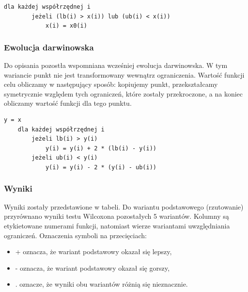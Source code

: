 \documentclass{mini}
\begin{document}
\begin{Verbatim}[baselinestretch=1.1]
	dla każdej współrzędnej i
		jeżeli (lb(i) > x(i)) lub (ub(i) < x(i))
			x(i) = x0(i)
\end{Verbatim}

\subsubsection*{Ewolucja darwinowska}
Do opisania pozostła wspomniana wcześniej ewolucja darwinowska. W tym wariancie punkt nie jest transformowany wewnątrz ograniczenia. Wartość funkcji celu obliczamy w następujący sposób: kopiujemy punkt, przekształcamy symetrycznie względem tych ograniczeń, które zostały przekroczone, a na koniec obliczamy wartość funkcji dla tego punktu.

\begin{Verbatim}[baselinestretch=1.1]
	y = x
	dla każdej współrzędnej i
		jeżeli lb(i) > y(i)
			y(i) = y(i) + 2 * (lb(i) - y(i))
		jeżeli ub(i) < y(i)
			y(i) = y(i) - 2 * (y(i) - ub(i))
\end{Verbatim}

\subsubsection *{Wyniki}
Wyniki zostały przedstawione w tabeli. Do wariantu podstawowego (rzutowanie) przyrównano wyniki testu Wilcoxona pozostałych 5 wariantów. Kolumny są etykietowane numerami funkcji, natomiast wierze wariantami uwzględniania ograniczeń. Oznaczenia symboli na przecięciach:
\begin{itemize}[noitemsep]
\item + oznacza, że wariant podstawowy okazał się lepszy,
\item - oznacza, że wariant podstawowy okazał się gorszy,
\item . oznacze, że wyniki obu wariantów różnią się nieznacznie.
\end{itemize}
\end{document}
